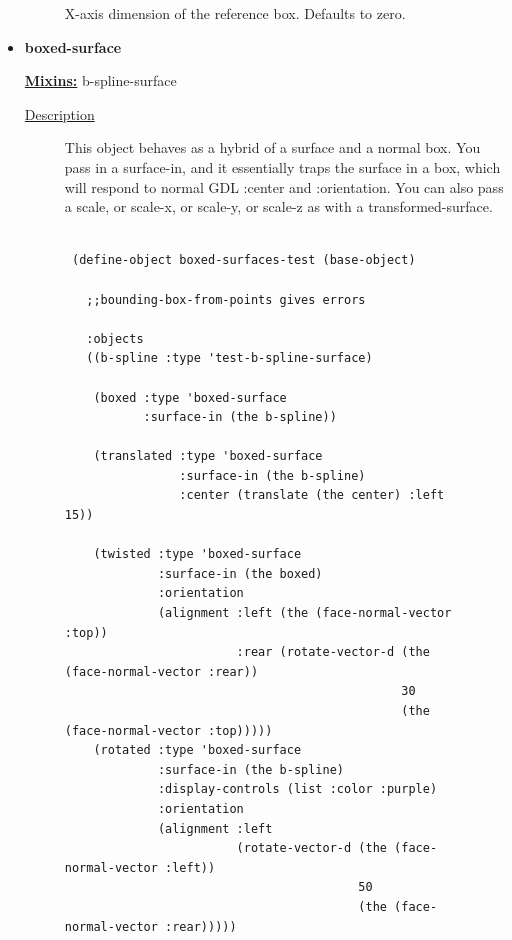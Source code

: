 \documentclass [11pt]{book}
\begin{document}
\begin{itemize}
\begin{description}
 X-axis dimension of the reference box. Defaults to zero.




\end{description}







\item {}
\label{prim:boxed-surface}
\textbf{boxed-surface}


\textbf{
\underline{Mixins:}} b-spline-surface





\begin{description}

\item [
\underline{Description}]


This object behaves as a hybrid of a surface and a normal box. You 
pass in a surface-in, and it essentially traps the surface in a box, which will respond to normal
GDL :center and :orientation. You can also pass a scale, or scale-x, or scale-y, or scale-z as with
a transformed-surface.



\end{description}




\begin{figure}
\begin{lrbox}{\boxedverb}
\begin{minipage}{\linewidth}
{\small

\begin{verbatim}

 (define-object boxed-surfaces-test (base-object)

   ;;bounding-box-from-points gives errors  
  
   :objects
   ((b-spline :type 'test-b-spline-surface)
   
    (boxed :type 'boxed-surface
           :surface-in (the b-spline))
   
    (translated :type 'boxed-surface
                :surface-in (the b-spline)
                :center (translate (the center) :left 15))
   
    (twisted :type 'boxed-surface
             :surface-in (the boxed)
             :orientation 
             (alignment :left (the (face-normal-vector :top))
                        :rear (rotate-vector-d (the (face-normal-vector :rear))
                                               30
                                               (the (face-normal-vector :top)))))
    (rotated :type 'boxed-surface
             :surface-in (the b-spline)
             :display-controls (list :color :purple)
             :orientation 
             (alignment :left 
                        (rotate-vector-d (the (face-normal-vector :left))
                                         50
                                         (the (face-normal-vector :rear)))))
    

\end{verbatim}}
\end{minipage}
\end{lrbox}
\end{figure}
\end{itemize}
\end{document}
